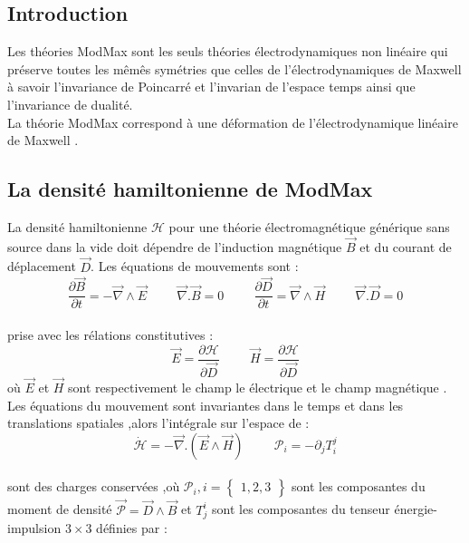 \documentclass[12pt,a4paper, openany]{article}
\begin{document}
\subsection{Introduction}
\hspace{0.5cm}Les théories ModMax sont les seuls théories électrodynamiques non linéaire qui préserve toutes les m\^{e}m\^{e}s symétries que celles de l'électrodynamiques de Maxwell à  savoir l'invariance de Poincarré et l'invarian de l'espace temps ainsi que l'invariance de dualité.\\
La théorie ModMax correspond à une déformation de l'électrodynamique linéaire de Maxwell . 
\subsection{La densité hamiltonienne de ModMax}
La densité hamiltonienne $\mathcal{H}$ pour une théorie électromagnétique générique sans source dans la vide doit dépendre de l'induction magnétique $\vec{B}$ et du courant de déplacement $\vec{D}$. Les équations de mouvements sont :
\begin{equation}
\frac{\partial{\vec{B}}}{\partial t}=-\vec{\nabla}\wedge\vec{E} \hspace{1cm} \vec{\nabla}.\vec{B}=0 \hspace{1cm}
\frac{\partial{\vec{D}}}{\partial t}=\vec{\nabla}\wedge\vec{H}  \hspace{1cm} \vec{\nabla}.\vec{D}=0 
\end{equation}\\
prise avec les rélations constitutives :
\begin{equation}
\vec{E}=\frac{\partial{\mathcal{H}}}{\partial{\vec{D}}} \hspace{1cm}  \vec{H}=\frac{\partial{\mathcal{H}}}{\partial{\vec{D}}} 
\end{equation}
où $\vec{E}$ et $\vec{H}$ sont respectivement le champ le électrique et le champ magnétique .
Les équations  du mouvement sont invariantes dans le temps et dans les translations spatiales ,alors l'intégrale sur l'espace de :
\begin{equation}
\dot{\mathcal{H}}=-\vec{\nabla}.(\vec{E} \wedge\vec{H}) \hspace{1cm} \mathcal{P}_i=-\partial_jT_i^j  
\end{equation}\\
sont des charges conservées ,où $\mathcal{P}_i ,i=\left\{\begin{aligned}
	1,2,3
\end{aligned}\right\}$ sont les composantes du moment de densité $\vec{\mathcal{P}}=\vec{D}\wedge\vec{B}$ et $ T^i_j $ sont les composantes du tenseur énergie- impulsion $3\times3$ définies par :\\
\end{document}
